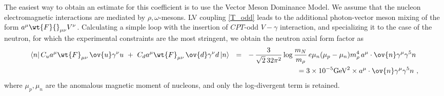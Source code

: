 \documentclass[prl,tightenlines]{revtex4}
\begin{document}
The easiest way to obtain an estimate for this coefficient is to use the Vector Meson Dominance Model.
We assume that the nucleon electromagnetic interactions  are mediated by $ \rho,\omega $-mesons.
 LV coupling \eqref{T_odd} leads to the additional photon-vector meson mixing of the 
form $a^\mu \wt{F}{}_{\mu\nu} V^\nu$.  
Calculating a simple loop with the insertion of $CPT$-odd $V-\gamma$ interaction, 
and specializing it to the case of the neutron, for which the experimental constraints are the 
most stringent, we obtain the neutron axial form factor as
\begin{eqnarray}
	\langle n|\,  
	C_u a^\mu \wt{F}_{\mu\nu} \,
		\ov{u} \gamma^\nu u
	~+~
	C_d a^\mu \wt{F}_{\mu\nu} \,
		\ov{d} \gamma^\nu d
	\, |n \rangle ~~=~~
	-\,\frac{3}{\sqrt{2}\,32\pi^2}\log \frac{m_N}{m_\rho}\, e \mu_n ( \mu_p - \mu_n ) m_\rho^4\,
			a^\mu \cdot \ov{n} \gamma^\mu \gamma^5 n~ \nonumber\\
			= 3 \times 10^{-5} {\rm GeV}^2 \times a^\mu \cdot \ov{n} \gamma^\mu \gamma^5 n~,
\end{eqnarray}
where $\mu_p, \mu_n$ are the anomalous magnetic moment of nucleons, and only the log-divergent term is retained. 
\end{document}

